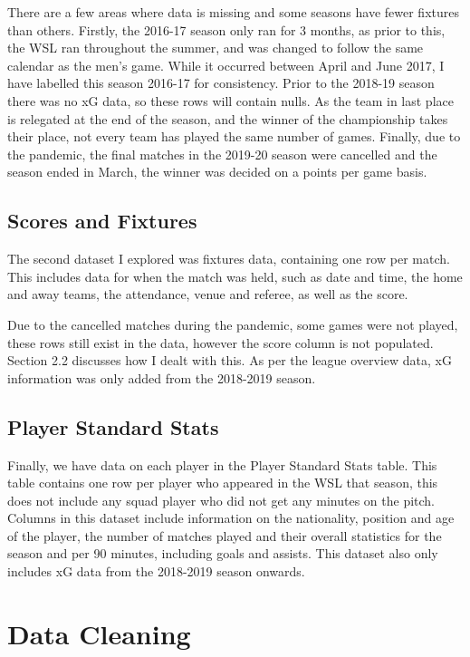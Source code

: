 \documentclass[12pt, a4paper, twocolumn]{article}
\begin{document}
There are a few areas where data is missing and some seasons have fewer fixtures than others. Firstly, the 2016-17 season only ran for 3 months, as prior to this, the WSL ran throughout the summer, and was changed to follow the same calendar as the men's game. While it occurred between April and June 2017, I have labelled this season 2016-17 for consistency. Prior to the 2018-19 season there was no xG data, so these rows will contain nulls. As the team in last place is relegated at the end of the season, and the winner of the championship takes their place, not every team has played the same number of games. Finally, due to the pandemic, the final matches in the 2019-20 season were cancelled and the season ended in March, the winner was decided on a points per game basis.

\subsection{Scores and Fixtures}

The second dataset I explored was fixtures data\cite{fixtures}, containing one row per match. This includes data for when the match was held, such as date and time, the home and away teams, the attendance, venue and referee, as well as the score.

Due to the cancelled matches during the pandemic, some games were not played, these rows still exist in the data, however the score column is not populated. Section 2.2 discusses how I dealt with this. As per the league overview data, xG information was only added from the 2018-2019 season.

\subsection{Player Standard Stats}

Finally, we have data on each player in the Player Standard Stats table\cite{players}. This table contains one row per player who appeared in the WSL that season, this does not include any squad player who did not get any minutes on the pitch. Columns in this dataset include information on the nationality, position and age of the player, the number of matches played and their overall statistics for the season and per 90 minutes, including goals and assists. This dataset also only includes xG data from the 2018-2019 season onwards.

\section{Data Cleaning}
\end{document}
